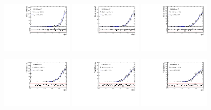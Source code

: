 \begin{figure}[h]
\centering
\includegraphics[height=!,width=0.32\textwidth]{figs/Resolution/SignalData_17_bin_1.pdf}
\includegraphics[height=!,width=0.32\textwidth]{figs/Resolution/SignalData_17_bin_2.pdf}
\includegraphics[height=!,width=0.32\textwidth]{figs/Resolution/SignalData_17_bin_3.pdf}

\includegraphics[height=!,width=0.32\textwidth]{figs/Resolution/SignalData_17_bin_4.pdf}
\includegraphics[height=!,width=0.32\textwidth]{figs/Resolution/SignalData_17_bin_5.pdf}
\includegraphics[height=!,width=0.32\textwidth]{figs/Resolution/SignalData_17_bin_6.pdf}


\end{figure}
